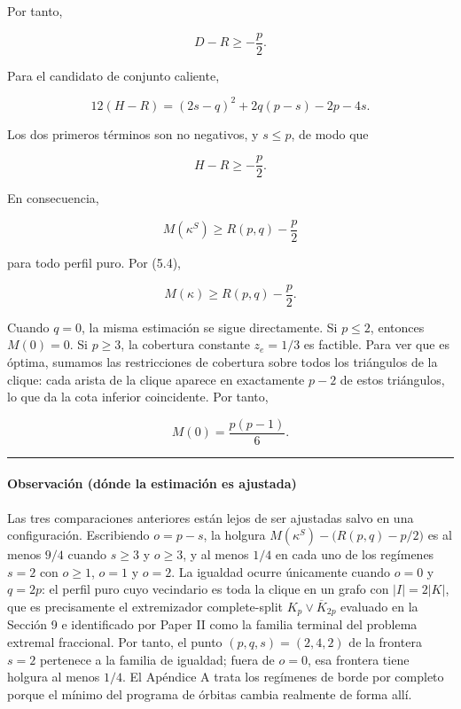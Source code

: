 \documentclass[spanish,11pt,a4paper]{article}
\begin{document}
Por tanto,

\[
D-R\ge-\frac p2.
\tag{7.5}
\]

Para el candidato de conjunto caliente,

\[
12(H-R)
=
(2s-q)^2+2q(p-s)-2p-4s.
\tag{7.6}
\]

Los dos primeros términos son no negativos, y \(s\le p\), de modo que

\[
H-R\ge-\frac p2.
\tag{7.7}
\]

En consecuencia,

\[
M(\kappa^S)
\ge
R(p,q)-\frac p2
\]

para todo perfil puro. Por (5.4),

\[
\boxed{
M(\kappa)
\ge
R(p,q)-\frac p2
}.
\tag{7.8}
\]

Cuando \(q=0\), la misma estimación se sigue directamente. Si \(p\le2\),
entonces \(M(0)=0\). Si \(p\ge3\), la cobertura constante \(z_e=1/3\) es
factible. Para ver que es óptima, sumamos las restricciones de cobertura
sobre todos los triángulos de la clique: cada arista de la clique
aparece en exactamente \(p-2\) de estos triángulos, lo que da la cota
inferior coincidente. Por tanto,

\[
M(0)=\frac{p(p-1)}6.
\]

\begin{center}\rule{0.5\linewidth}{0.5pt}\end{center}

\paragraph{Observación (dónde la estimación es
ajustada)}\label{observaciuxf3n-duxf3nde-la-estimaciuxf3n-es-ajustada}

Las tres comparaciones anteriores están lejos de ser ajustadas salvo en
una configuración. Escribiendo \(o=p-s\), la holgura
\(M(\kappa^S)-\big(R(p,q)-p/2\big)\) es al menos \(9/4\) cuando
\(s\ge3\) y \(o\ge3\), y al menos \(1/4\) en cada uno de los regímenes
\(s=2\) con \(o\ge1\), \(o=1\) y \(o=2\). La igualdad ocurre únicamente
cuando \(o=0\) y \(q=2p\): el perfil puro cuyo vecindario es toda la
clique en un grafo con \(|I|=2|K|\), que es precisamente el extremizador
complete-split \(K_p\vee\overline K_{2p}\) evaluado en la Sección 9 e
identificado por Paper II como la familia terminal del problema extremal
fraccional. Por tanto, el punto \((p,q,s)=(2,4,2)\) de la frontera
\(s=2\) pertenece a la familia de igualdad; fuera de \(o=0\), esa
frontera tiene holgura al menos \(1/4\). El Apéndice A trata los
regímenes de borde por completo porque el mínimo del programa de órbitas
cambia realmente de forma allí.
\end{document}
